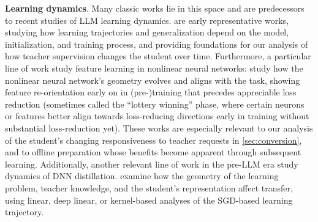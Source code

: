 \textbf{Learning dynamics}. Many classic works lie in this space and are predecessors to recent studies of LLM learning dynamics. \cite{Biehl_1995,PhysRevLett.74.4337,saxe2014exactsolutionsnonlineardynamics,NEURIPS2019_cab070d5} are early representative works, studying how learning trajectories and generalization depend on the model, initialization, and training process, and providing foundations for our analysis of how teacher supervision changes the student over time. Furthermore, a particular line of work study feature learning in nonlinear neural networks: \cite{pmlr-v130-baratin21a,atanasov2022neural,hong2024why,9719702,pmlr-v195-allen-zhu23a} study how the nonlinear neural network’s geometry evolves and aligns with the task, showing feature re-orientation early on in (pre-)training that precedes appreciable loss reduction (sometimes called the ``lottery winning'' phase, where certain neurons or features better align towards loss-reducing directions early in training without substantial loss-reduction yet). These works are especially relevant to our analysis of the student’s changing responsiveness to teacher requests in \cref{sec:conversion}, and to offline preparation whose benefits become apparent through subsequent learning. Additionally, another relevant line of work in the pre-LLM era study dynamics of DNN distillation. \cite{pmlr-v97-phuong19a,NEURIPS2020_ef0d3930,Hong_2021_CVPR,allenzhu2023understandingensembleknowledgedistillation,10.1145/3511808.3557237,he2022feature} examine how the geometry of the learning problem, teacher knowledge, and the student’s representation affect transfer, using linear, deep linear, or kernel-based analyses of the SGD-based learning trajectory.